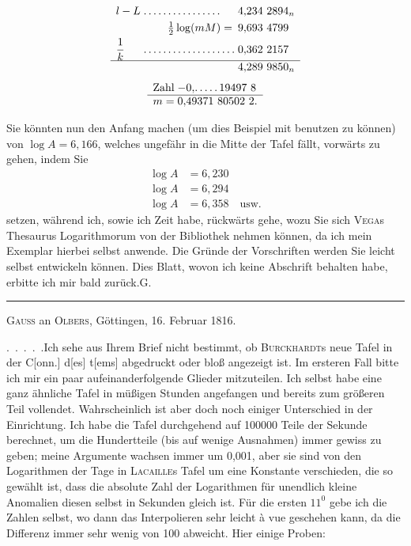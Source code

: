 \[
\begin{array}{l@{\;}l@{\;}l}
l-L&.\,.\,.\,.\,.\,.\,.\,.\,.\,.\,.\,.\,.\,.\,.\,.&4{,}234\ 2894_n\\[3pt]
\multicolumn{2}{r}{\tfrac12\log(mM)=}&9{,}693\ 4799\\[3pt]
\dfrac1k&.\,.\,.\,.\,.\,.\,.\,.\,.\,.\,.\,.\,.\,.\,.\,.\,.\,.\,.&0{,}362\ 2157\\[3pt]\hline
&&4{,}289\ 9850_n
\end{array}
\]
\[
\begin{array}{r@{\;}l}
\text{Zahl}&-0{,}.\,.\,.\,.\,.\,19497\ 8\\\hline
m=&0{,}49371\ 80502\ 2.
\end{array}
\]
\par
\noindent\hspace*{\parindent}Sie könnten nun den Anfang machen (um dies Beispiel mit benutzen zu können) von \(\log A=6{,}166\), welches ungefähr in die Mitte der Tafel fällt, vorwärts zu gehen, indem Sie
\[
\begin{aligned}
\log A&=6{,}230\\
\log A&=6{,}294\\
\log A&=6{,}358\quad\text{usw.}
\end{aligned}
\]
setzen, während ich, sowie ich Zeit habe, rückwärts gehe, wozu Sie sich \textsc{Vega}s Thesaurus Logarithmorum von der Bibliothek nehmen können, da ich mein Exemplar hierbei selbst anwende. Die Gründe der Vorschriften werden Sie leicht selbst entwickeln können. Dies Blatt, wovon ich keine Abschrift behalten habe, erbitte ich mir bald zurück.\hfill G.
\par\medskip
\begin{center}\rule{.22\textwidth}{.4pt}\end{center}
\begin{center}\textsc{Gauss} an \textsc{Olbers}, Göttingen, 16. Februar 1816.\end{center}
\noindent\hspace*{\parindent}.\ .\ .\ .\ .\quad Ich sehe aus Ihrem Brief nicht bestimmt, ob \textsc{Burckhardt}s neue Tafel in der C[onn.] d[es] t[ems] abgedruckt oder bloß angezeigt ist. Im ersteren Fall bitte ich mir ein paar aufeinanderfolgende Glieder mitzuteilen. Ich selbst habe eine ganz ähnliche Tafel in müßigen Stunden angefangen und bereits zum größeren Teil vollendet. Wahrscheinlich ist aber doch noch einiger Unterschied in der Einrichtung. Ich habe die Tafel durchgehend auf 100000 Teile der Sekunde berechnet, um die Hundertteile (bis auf wenige Ausnahmen) immer gewiss zu geben; meine Argumente wachsen immer um 0,001, aber sie sind von den Logarithmen der Tage in \textsc{Lacaille}s Tafel um eine Konstante verschieden, die so gewählt ist, dass die absolute Zahl der Logarithmen für unendlich kleine Anomalien diesen selbst in Sekunden gleich ist. Für die ersten \(11^0\) gebe ich die Zahlen selbst, wo dann das Interpolieren sehr leicht à vue geschehen kann, da die Differenz immer sehr wenig von 100 abweicht. Hier einige Proben\HistoricalNoteEight{\textsc{Gauss} gibt drei Proben, von denen hier nur die erste abgedruckt ist.]}:
